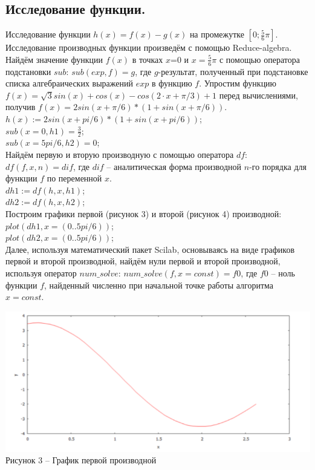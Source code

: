 \documentclass[russian, utf8, nocolumnxxxi, nocolumnxxxii, 14pt]{eskdtext}
\begin{document}
\subsection{Исследование функции.}
\indent Исследование функции  $h(x) = f(x) - g(x)$ на промежутке $[0;\frac{5}{6}\pi]$.\\
Исследование производных функции произведём с помощью Reduce-algebra.\\
\indent Найдём значение функции $f(x)$ в точках $x$=0 и $x=\frac{5}{6}\pi$ с помощью оператора подстановки $sub$: $sub(exp,f)=g$, где $g$-результат, полученный при подстановке списка алгебраических выражений $exp$ в функцию $f$. Упростим функцию $f(x) = \sqrt{3}sin(x) + cos(x) - cos(2 \cdot x + \pi/3) + 1$ перед вычислениями, получив $f(x) = 2sin(x+\pi/6)*(1+sin(x+\pi/6))$.\\
$h(x):=2sin(x+pi/6)*(1+sin(x+pi/6))$;\\
$sub(x=0,h1) = \frac{3}{2}$;\\
$sub(x=5pi/6,h2) = 0$;\\
\indent Найдём первую и вторую производную с помощью оператора $df$: $df(f,x,n) = dif$, где $dif$ – аналитическая форма производной $n$-го порядка для функции $f$ по переменной $x$.\\
$dh1:=df(h,x,h1)$;\\
$dh2:=df(h,x,h2)$;\\
\indent Построим графики первой (рисунок 3) и второй (рисунок 4) производной:\\
$plot(dh1,x=(0..5pi/6))$;\\
$plot(dh2,x=(0..5pi/6))$;\\
\indent Далее, используя математический пакет Scilab, основываясь на виде графиков первой и второй производной, найдём нули первой и второй производной, используя оператор $num\_solve$: $num\_solve(f,x = const) = f0$, где $f0$ – ноль функции $f$, найденный численно при начальной точке работы алгоритма $x = const.$\\
\begin{center}
\includegraphics[scale=0.8]{JPG/drei.png}\\
Рисунок 3 -- График первой производной\\
\end{center}
\end{document}
